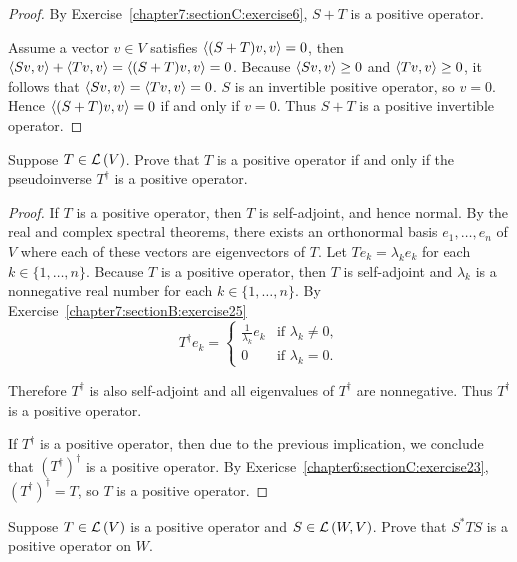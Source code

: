 \begin{proof}
    By Exercise~\ref{chapter7:sectionC:exercise6}, $S + T$ is a positive operator.

    Assume a vector $v\in V$ satisfies $\left\langle{(S + T)v, v}\right\rangle = 0$, then $\left\langle{Sv, v}\right\rangle + \left\langle{Tv, v}\right\rangle = \left\langle{(S + T)v, v}\right\rangle = 0$. Because $\left\langle{Sv, v}\right\rangle\geq 0$ and $\left\langle{Tv, v}\right\rangle\geq 0$, it follows that $\left\langle{Sv, v}\right\rangle = \left\langle{Tv, v}\right\rangle = 0$. $S$ is an invertible positive operator, so $v = 0$. Hence $\left\langle{(S + T)v, v}\right\rangle = 0$ if and only if $v = 0$. Thus $S + T$ is a positive invertible operator.
\end{proof}
\newpage

\begin{exercise}
    Suppose $T \in \mathcal{L}\left({V}\right)$. Prove that $T$ is a positive operator if and only if the pseudoinverse $T^{\dagger}$ is a positive operator.
\end{exercise}

\begin{proof}
    If $T$ is a positive operator, then $T$ is self-adjoint, and hence normal. By the real and complex spectral theorems, there exists an orthonormal basis $e_{1}, \ldots, e_{n}$ of $V$ where each of these vectors are eigenvectors of $T$. Let $Te_{k} = \lambda_{k}e_{k}$ for each $k\in\{1,\ldots,n\}$. Because $T$ is a positive operator, then $T$ is self-adjoint and $\lambda_{k}$ is a nonnegative real number for each $k\in\{1,\ldots,n\}$. By Exercise~\ref{chapter7:sectionB:exercise25}
    \[
        T^{\dagger}e_{k} = \begin{cases}
            \frac{1}{\lambda_{k}}e_{k} & \text{if $\lambda_{k}\ne 0$}, \\
            0                          & \text{if $\lambda_{k} = 0$}.
        \end{cases}
    \]

    Therefore $T^{\dagger}$ is also self-adjoint and all eigenvalues of $T^{\dagger}$ are nonnegative. Thus $T^{\dagger}$ is a positive operator.

    If $T^{\dagger}$ is a positive operator, then due to the previous implication, we conclude that ${(T^{\dagger})}^{\dagger}$ is a positive operator. By Exericse~\ref{chapter6:sectionC:exercise23}, ${(T^{\dagger})}^{\dagger} = T$, so $T$ is a positive operator.
\end{proof}
\newpage

\begin{exercise}
    Suppose $T \in \mathcal{L}\left({V}\right)$ is a positive operator and $S \in \mathcal{L}\left({W, V}\right)$. Prove that $S^{*}TS$ is a positive operator on $W$.
\end{exercise}

